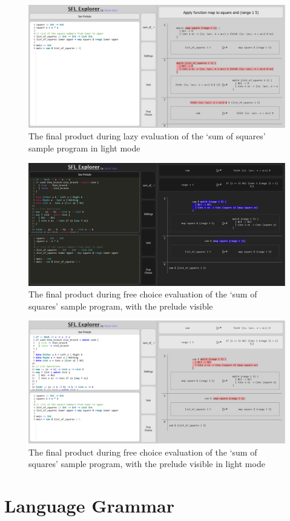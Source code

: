 \begin{figure}[h]
    \centering
    \includegraphics[width=\linewidth]{images/final_light.png} 
    \captionsetup{justification=centering}
    \caption{The final product during lazy evaluation of the `sum of squares' sample program in light mode}
    \label{fig:screenshot_final_light}
\end{figure}

\begin{figure}[h]
    \centering
    \includegraphics[width=\linewidth]{images/final_dark_prelude_free.png} 
    \captionsetup{justification=centering}
    \caption{The final product during free choice evaluation of the `sum of squares' sample program, with the prelude visible}
    \label{fig:screenshot_final_dark_prelude_free}
\end{figure}

\begin{figure}[h]
    \centering
    \includegraphics[width=\linewidth]{images/final_light_prelude_free.png} 
    \captionsetup{justification=centering}
    \caption{The final product during free choice evaluation of the `sum of squares' sample program, with the prelude visible in light mode}    
    \label{fig:screenshot_final_light_prelude_free}
\end{figure}

\chapter{Language Grammar}
